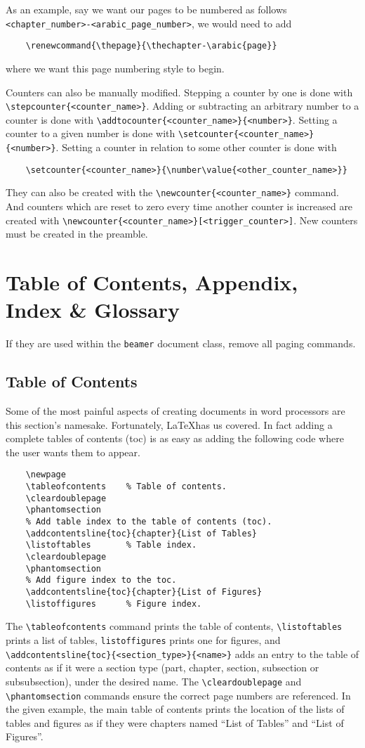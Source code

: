 As an example, say we want our pages to be numbered as follows \verb|<chapter_number>-<arabic_page_number>|, we would need to add
\begin{verbatim}
	\renewcommand{\thepage}{\thechapter-\arabic{page}}
\end{verbatim}
where we want this page numbering style to begin.

Counters can also be manually modified. Stepping a counter by one is done with \verb|\stepcounter{<counter_name>}|. Adding or subtracting an arbitrary number to a counter is done with \verb|\addtocounter{<counter_name>}{<number>}|. Setting a counter to a given number is done with \verb|\setcounter{<counter_name>}{<number>}|. Setting a counter in relation to some other counter is done with
\begin{verbatim}
	\setcounter{<counter_name>}{\number\value{<other_counter_name>}}
\end{verbatim}
They can also be created with the \verb|\newcounter{<counter_name>}| command. And counters which are reset to zero every time another counter is increased are created with \verb|\newcounter{<counter_name>}[<trigger_counter>]|. New counters must be created in the preamble.
%
\section{Table of Contents, Appendix, Index \& Glossary}\label{s:contents}
%
If they are used within the \verb|beamer| document class, remove all paging commands.
\subsection{Table of Contents}
%
Some of the most painful aspects of creating documents in word processors are this section's namesake. Fortunately, \LaTeX has us covered. In fact adding a complete tables of contents (toc) is as easy as adding the following code where the user wants them to appear.
\begin{verbatim}
	\newpage
	\tableofcontents    % Table of contents.
	\cleardoublepage
	\phantomsection
	% Add table index to the table of contents (toc).
	\addcontentsline{toc}{chapter}{List of Tables}
	\listoftables       % Table index.
	\cleardoublepage
	\phantomsection
	% Add figure index to the toc.
	\addcontentsline{toc}{chapter}{List of Figures}
	\listoffigures      % Figure index.
\end{verbatim}
The \verb|\tableofcontents| command prints the table of contents, \verb|\listoftables| prints a list of tables, \verb|listoffigures| prints one for figures, and \verb|\addcontentsline{toc}{<section_type>}{<name>}| adds an entry to the table of contents as if it were a section type (part, chapter, section, subsection or subsubsection), under the desired name. The \verb|\cleardoublepage| and \verb|\phantomsection| commands ensure the correct page numbers are referenced. In the given example, the main table of contents prints the location of the lists of tables and figures as if they were chapters named ``List of Tables'' and ``List of Figures''.


